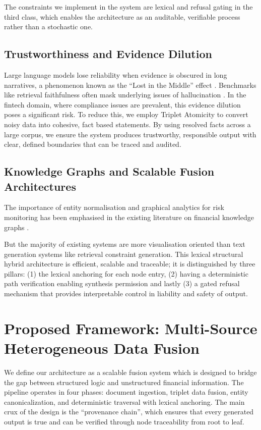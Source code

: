 \documentclass[conference]{IEEEtran}
\begin{document}
The constraints we implement in the system are lexical and refusal gating in the third class, which enables the architecture as an auditable, verifiable process rather than a stochastic one.

\subsection{Trustworthiness and Evidence Dilution}
Large language models lose reliability when evidence is obscured in long narratives, a phenomenon known as the \enquote{Lost in the Middle} effect \cite{liu2024lostmiddle}. Benchmarks like retrieval faithfulness often mask underlying issues of hallucination \cite{truthfulqa2022,ragas2023,hotpotqa2018,fever2018}. In the fintech domain, where compliance issues are prevalent, this evidence dilution poses a significant risk. To reduce this, we employ Triplet Atomicity to convert noisy data into cohesive, fact based statements. By using resolved facts across a large corpus, we ensure the system produces trustworthy, responsible output with clear, defined boundaries that can be traced and audited.

\subsection{Knowledge Graphs and Scalable Fusion Architectures}
The importance of entity normalisation and graphical analytics for risk monitoring has been emphasised in the existing literature on financial knowledge graphs \cite{edgargraph,finkgsurvey,opencyc2018,finbert2020}.

But the majority of existing systems are more visualisation oriented than text generation systems like retrieval constraint generation. This lexical structural hybrid architecture is efficient, scalable and traceable; it is distinguished by three pillars: (1) the lexical anchoring for each node entry, (2) having a deterministic path verification enabling synthesis permission and lastly (3) a gated refusal mechanism that provides interpretable control in liability and safety of output.

\section{Proposed Framework: Multi-Source Heterogeneous Data Fusion}
We define our architecture as a scalable fusion system which is designed to bridge the gap between structured logic and unstructured financial information. The pipeline operates in four phases: document ingestion, triplet data fusion, entity canonicalization, and deterministic traversal with lexical anchoring. The main crux of the design is the \enquote{provenance chain}, which ensures that every generated output is true and can be verified through node traceability from root to leaf.
\end{document}
